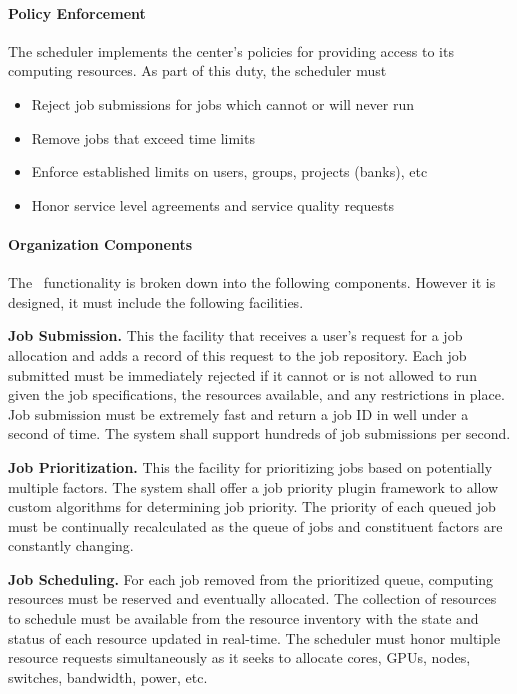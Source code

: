 \paragraph{Policy Enforcement}

The scheduler implements the center's policies for providing access to
its computing resources.  As part of this duty, the scheduler must

\begin{itemize}
  \item Reject job submissions for jobs which cannot or will never run
  \item Remove jobs that exceed time limits
  \item Enforce established limits on users, groups, projects (banks), etc
  \item Honor service level agreements and service quality requests
\end{itemize}

\paragraph{Organization Components}

The \ngjs\ functionality is broken down into the following components.
However it is designed, it must include the following facilities.

\textbf{Job Submission.} This the facility that receives a user's
request for a job allocation and adds a record of this request to
the job repository.  Each job submitted must be immediately rejected
if it cannot or is not allowed to run given the job specifications,
the resources available, and any restrictions in place.  Job
submission must be extremely fast and return a job ID in well under a
second of time.  The system shall support hundreds of job submissions
per second.

\textbf{Job Prioritization.}  This the facility for prioritizing jobs
based on potentially multiple factors.  The system shall offer a job
priority plugin framework to allow custom algorithms for determining
job priority.  The priority of each queued job must be continually
recalculated as the queue of jobs and constituent factors are
constantly changing.

\textbf{Job Scheduling.} For each job removed from the prioritized
queue, computing resources must be reserved and eventually allocated.
The collection of resources to schedule must be available from the
resource inventory with the state and status of each resource updated in
real-time.  The scheduler must honor multiple resource requests
simultaneously as it seeks to allocate cores, GPUs, nodes, switches,
bandwidth, power, etc.


